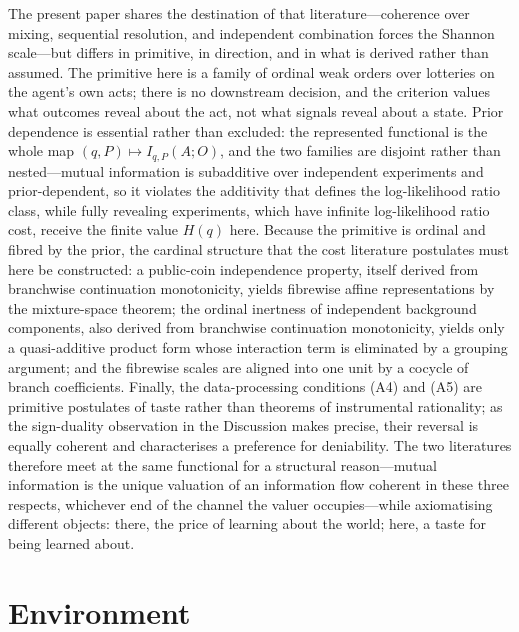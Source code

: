 \documentclass[11pt,a4paper]{article}
\theoremstyle{definition}
\newcommand{\1}{\mathbf 1}
\begin{document}
The present paper shares the destination of that literature---coherence over mixing, sequential resolution, and
independent combination forces the Shannon scale---but differs in primitive, in direction, and in what is derived
rather than assumed.  The primitive here is a family of ordinal weak orders over lotteries on the agent's own acts;
there is no downstream decision, and the criterion values what outcomes reveal about the act, not what signals reveal
about a state.  Prior dependence is essential rather than excluded: the represented functional is the whole map
$(q,P)\mapsto I_{q,P}(A;O)$, and the two families are disjoint rather than nested---mutual information is subadditive
over independent experiments and prior-dependent, so it violates the additivity that defines the log-likelihood ratio
class, while fully revealing experiments, which have infinite log-likelihood ratio cost, receive the finite value
$H(q)$ here.  Because the primitive is ordinal and fibred by the prior, the cardinal structure that the cost literature
postulates must here be constructed: a public-coin independence property, itself derived from branchwise continuation
monotonicity, yields fibrewise affine representations by the
mixture-space theorem; the ordinal inertness of independent background components, also derived from branchwise
continuation monotonicity, yields only a quasi-additive product form whose interaction term is eliminated by a grouping
argument; and the fibrewise scales are aligned into one unit by a cocycle of branch coefficients.  Finally, the data-processing conditions \textup{(A4)} and \textup{(A5)} are primitive
postulates of taste rather than theorems of instrumental rationality; as the sign-duality observation in the Discussion
makes precise, their reversal is equally coherent and characterises a preference for deniability.  The two literatures
therefore meet at the same functional for a structural reason---mutual information is the unique valuation of an
information flow coherent in these three respects, whichever end of the channel the valuer occupies---while
axiomatising different objects: there, the price of learning about the world; here, a taste for being learned about.

\section*{Environment}
\end{document}
